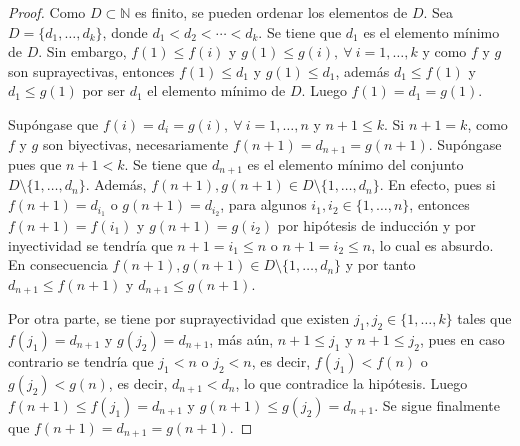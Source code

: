 \begin{proof}
Como $D\subset \mathbb{N}$ es finito, se pueden ordenar los elementos de $D$. Sea $D=\{d_1,\ldots,d_k\}$, donde $d_1<d_2<\cdots<d_k$. Se tiene que $d_1$ es el elemento mínimo de $D$. Sin embargo, $f(1)\leq f(i)$ y $g(1)\leq g(i),\:\forall \: i=1,\ldots,k$ y como $f$ y $g$ son suprayectivas, entonces $f(1)\leq d_1$ y $g(1)\leq d_1$, además $d_1\leq f(1)$ y $d_1\leq g(1)$ por ser $d_1$ el elemento mínimo de $D$. Luego $f(1)=d_1=g(1)$.
\bigskip


Supóngase que $f(i)=d_i=g(i),\:\forall \: i=1,\ldots,n$ y $n+1\leq k$. Si $n+1=k$, como $f$ y $g$ son biyectivas, necesariamente $f(n+1)=d_{n+1}=g(n+1)$. Supóngase pues que $n+1<k$. Se tiene que $d_{n+1}$ es el elemento mínimo del conjunto $D \setminus \{1,\ldots,d_n\}$. Además, $f(n+1),g(n+1)\in D\setminus \{1,\ldots,d_n\}$. En efecto, pues si $f(n+1)=d_{i_1}$ o $g(n+1)=d_{i_2}$, para algunos $i_1,i_2\in \{1,\ldots,n\}$, entonces $f(n+1)=f(i_1)$ y $g(n+1)=g(i_2)$ por hipótesis de inducción y por inyectividad se tendría que $n+1=i_1\leq n$ o $n+1=i_2\leq n$, lo cual es absurdo. En consecuencia $f(n+1),g(n+1)\in D \setminus \{1,\ldots,d_n\}$ y por tanto $d_{n+1}\leq f(n+1)$ y $d_{n+1}\leq g(n+1)$. 
\bigskip

Por otra parte, se tiene por suprayectividad que existen $j_1,j_2\in \{1,\ldots,k\}$ tales que $f(j_1)=d_{n+1}$ y $g(j_2)=d_{n+1}$, más aún, $n+1\leq j_1$ y $n+1\leq j_2$, pues en caso contrario se tendría que $j_1<n$ o $j_2<n$, es decir, $f(j_1)<f(n)$ o $g(j_2)<g(n)$, es decir, $d_{n+1}<d_n$, lo que contradice la hipótesis. Luego $f(n+1)\leq f(j_1)=d_{n+1}$ y $g(n+1)\leq g(j_2)=d_{n+1}$. Se sigue finalmente que $f(n+1)=d_{n+1}=g(n+1)$.
\end{proof}

